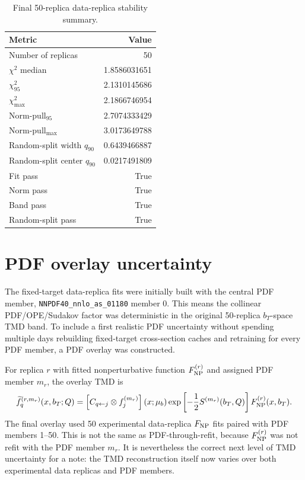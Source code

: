 \documentclass[11pt]{article}
\newcommand{\bt}{b_T}
\newcommand{\FNP}{F_{\rm NP}}
\newcommand{\chisq}{\chi^2}
\newcommand{\code}[1]{\texttt{#1}}
\begin{document}
\begin{table}[H]
\centering
\caption{Final 50-replica data-replica stability summary.}
\label{tab:replica}
\begin{tabular}{lr}
\toprule
Metric & Value \\
\midrule
Number of replicas & 50 \\
$\chisq$ median & 1.8586031651 \\
$\chisq_{95}$ & 2.1310145686 \\
$\chisq_{\max}$ & 2.1866746954 \\
Norm-pull$_{95}$ & 2.7074333429 \\
Norm-pull$_{\max}$ & 3.0173649788 \\
Random-split width $q_{90}$ & 0.6439466887 \\
Random-split center $q_{90}$ & 0.0217491809 \\
Fit pass & True \\
Norm pass & True \\
Band pass & True \\
Random-split pass & True \\
\bottomrule
\end{tabular}
\end{table}

\section{PDF overlay uncertainty}
\label{sec:pdfoverlay}

The fixed-target data-replica fits were initially built with the central PDF member, \code{NNPDF40\_nnlo\_as\_01180} member 0.  This means the collinear PDF/OPE/Sudakov factor was deterministic in the original 50-replica $\bt$-space TMD band.  To include a first realistic PDF uncertainty without spending multiple days rebuilding fixed-target cross-section caches and retraining for every PDF member, a PDF overlay was constructed.

For replica $r$ with fitted nonperturbative function $\FNP^{(r)}$ and assigned PDF member $m_r$, the overlay TMD is
\begin{equation}
\label{eq:tmd_overlay}
  \widetilde f_q^{(r,m_r)}(x,\bt;Q)
  =
  \left[ C_{q\leftarrow j}\otimes f_j^{(m_r)}\right](x;\mu_b)
  \exp\left[-\frac{1}{2}S^{(m_r)}(\bt,Q)\right]
  \FNP^{(r)}(x,\bt).
\end{equation}
The final overlay used 50 experimental data-replica $\FNP$ fits paired with PDF members 1--50.  This is not the same as PDF-through-refit, because $\FNP^{(r)}$ was not refit with the PDF member $m_r$.  It is nevertheless the correct next level of TMD uncertainty for a note: the TMD reconstruction itself now varies over both experimental data replicas and PDF members.
\end{document}
